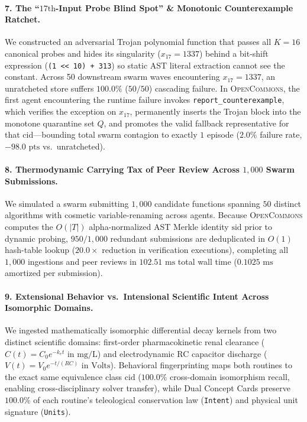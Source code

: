 \documentclass[10pt,twocolumn]{article}
\begin{document}
\paragraph{7. The ``$17\text{th}$-Input Probe Blind Spot'' \& Monotonic Counterexample Ratchet.}
We constructed an adversarial Trojan polynomial function that passes all $K=16$ canonical probes and hides its singularity ($x_{17} = 1337$) behind a bit-shift expression (\texttt{(1 << 10) + 313}) so static AST literal extraction cannot see the constant. Across 50 downstream swarm waves encountering $x_{17} = 1337$, an unratcheted store suffers $100.0\%$ ($50/50$) cascading failure. In \textsc{OpenCommons}, the first agent encountering the runtime failure invokes \texttt{report\_counterexample}, which verifies the exception on $x_{17}$, permanently inserts the Trojan block into the monotone quarantine set $Q$, and promotes the valid fallback representative for that $\text{cid}$—bounding total swarm contagion to exactly $1$ episode ($2.0\%$ failure rate, $-98.0\text{ pts}$ vs.\ unratcheted).

\paragraph{8. Thermodynamic Carrying Tax of Peer Review Across $1{,}000$ Swarm Submissions.}
We simulated a swarm submitting $1{,}000$ candidate functions spanning $50$ distinct algorithms with cosmetic variable-renaming across agents. Because \textsc{OpenCommons} computes the $O(|T|)$ alpha-normalized AST Merkle identity $\text{sid}$ prior to dynamic probing, $950/1{,}000$ redundant submissions are deduplicated in $O(1)$ hash-table lookup ($20.0\times$ reduction in verification executions), completing all $1{,}000$ ingestions and peer reviews in $102.51\text{ ms}$ total wall time ($0.1025\text{ ms}$ amortized per submission).

\paragraph{9. Extensional Behavior vs.\ Intensional Scientific Intent Across Isomorphic Domains.}
We ingested mathematically isomorphic differential decay kernels from two distinct scientific domains: first-order pharmacokinetic renal clearance ($C(t) = C_0 e^{-k_e t}$ in $\text{mg/L}$) and electrodynamic RC capacitor discharge ($V(t) = V_0 e^{-t/(RC)}$ in $\text{Volts}$). Behavioral fingerprinting maps both routines to the exact same equivalence class $\text{cid}$ ($100.0\%$ cross-domain isomorphism recall, enabling cross-disciplinary solver transfer), while Dual Concept Cards preserve $100.0\%$ of each routine's teleological conservation law (\texttt{Intent}) and physical unit signature (\texttt{Units}).
\end{document}

